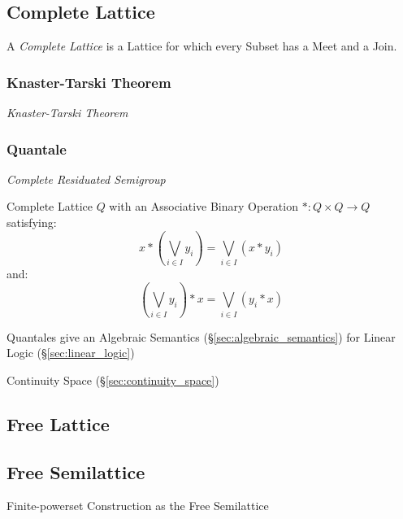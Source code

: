 \subsection{Complete Lattice}\label{sec:complete_lattice}

A \emph{Complete Lattice} is a Lattice for which every Subset has a
Meet and a Join.



\subsubsection{Knaster-Tarski Theorem}\label{sec:knaster_tarski}

\emph{Knaster-Tarski Theorem}



\subsubsection{Quantale}\label{sec:quantale}

\emph{Complete Residuated Semigroup}

Complete Lattice $Q$ with an Associative Binary Operation $* : Q
\times Q \rightarrow Q$ satisfying:
\[
  x*(\bigvee_{i \in I} y_i) = \bigvee_{i \in I}(x * y_i)
\]
and:
\[
  (\bigvee_{i \in I} y_i)*x = \bigvee_{i \in I}(y_i * x)
\]

Quantales give an Algebraic Semantics
(\S\ref{sec:algebraic_semantics}) for Linear Logic
(\S\ref{sec:linear_logic})

Continuity Space (\S\ref{sec:continuity_space})



\subsection{Free Lattice}\label{sec:free_lattice}

\subsection{Free Semilattice}\label{sec:free_semilattice}

Finite-powerset Construction as the Free Semilattice %

